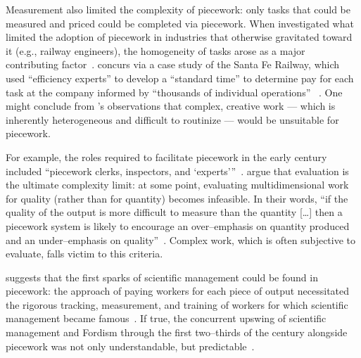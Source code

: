 \documentclass[trackingWork]{subfiles}
\begin{document}
Measurement also limited the complexity of piecework:
only tasks that could be measured and priced could be completed via piecework. 
When \citeauthor{Brown01041990} investigated
what limited the adoption of piecework in industries that otherwise gravitated toward it
(e.g., railway engineers),
the homogeneity of tasks arose as a major contributing factor~\cite{Brown01041990}.
\citeauthor{10.2307/23702539} concurs via a case study of the Santa Fe Railway,
which used ``efficiency experts'' to develop a ``standard time''
to determine pay for each task at the company informed by
``thousands of individual operations''%
~\cite{10.2307/23702539}.
One might conclude from \citeauthor{10.2307/23702539}'s observations that
complex, creative work
--- which is inherently heterogeneous and difficult to routinize ---
would be unsuitable for piecework.

For example, the roles required to facilitate piecework in the early  century included ``piecework clerks, inspectors, and `experts'''~\cite{10.2307/23702539}.
\citeauthor{hart2016rise} argue that evaluation is the ultimate complexity limit:
at some point, evaluating multidimensional work for quality
(rather than for quantity) becomes infeasible.
In their words,
``if the quality of the output is more difficult to measure than the quantity [\ldots]
then a piecework system is likely to encourage
an over--emphasis on quantity produced and an under--emphasis on quality''~\cite{hart2016rise}.
Complex work, which is often subjective to evaluate, falls victim to this criteria.

\citeauthor{10.2307/23702539} suggests that the first sparks of scientific management
could be found in piecework:
the approach of paying workers for each piece of output necessitated
the rigorous tracking, measurement, and training of workers
for which scientific management became famous~\cite{10.2307/23702539}.
If true, 
the concurrent upswing of
scientific management and Fordism
through the first two--thirds of the  century
alongside piecework was not only understandable, but predictable~\cite{hart2013rise}.
\end{document}
